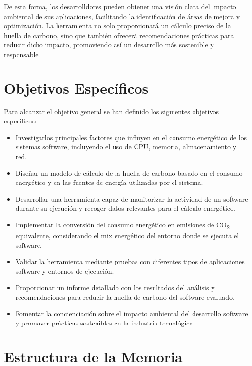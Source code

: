 \documentclass[12pt,a4paper]{report}
\begin{document}
De esta forma, los desarrolldores pueden obtener una visión clara del impacto
ambiental de sus aplicaciones, facilitando la identificación de áreas de mejora
y optimización. La herramienta no solo proporcionará un cálculo preciso de la
huella de carbono, sino que también ofrecerá recomendaciones prácticas para
reducir dicho impacto, promoviendo así un desarrollo más sostenible y
responsable.

\section{Objetivos Específicos}

Para alcanzar el objetivo general se han definido los siguientes objetivos
específicos:

\begin{itemize}
  \item Investigarlos principales factores que influyen en el consumo
        energético de los sistemas software, incluyendo el uso de CPU, memoria,
        almacenamiento y red.
  \item Diseñar un modelo de cálculo de la huella de carbono basado en el consumo
        energético y en las fuentes de energía utilizadas por el sistema.
  \item Desarrollar una herramienta capaz de monitorizar la actividad de un software
        durante su ejecución y recoger datos relevantes para el cálculo energético.
  \item Implementar la conversión del consumo energético en emisiones de
        CO\textsubscript{2} equivalente, considerando el mix energético del entorno
        donde se ejecuta el software.
  \item Validar la herramienta mediante pruebas con diferentes tipos de aplicaciones
        software y entornos de ejecución.
  \item Proporcionar un informe detallado con los resultados del análisis y
        recomendaciones para reducir la huella de carbono del software evaluado.
  \item Fomentar la concienciación sobre el impacto ambiental del desarrollo software y
        promover prácticas sostenibles en la industria tecnológica.
\end{itemize}

\section{Estructura de la Memoria}
\end{document}
